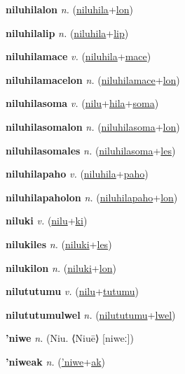 \textbf{\hypertarget{niluhilalon}{niluhilalon}} \textit{n.} (\hyperlink{niluhila}{niluhila}+\allowbreak \hyperlink{lon}{lon})


\textbf{\hypertarget{niluhilalip}{niluhilalip}} \textit{n.} (\hyperlink{niluhila}{niluhila}+\allowbreak \hyperlink{lip}{lip})


\textbf{\hypertarget{niluhilamace}{niluhilamace}} \textit{v.} (\hyperlink{niluhila}{niluhila}+\allowbreak \hyperlink{mace}{mace})


\textbf{\hypertarget{niluhilamacelon}{niluhilamacelon}} \textit{n.} (\hyperlink{niluhilamace}{niluhilamace}+\allowbreak \hyperlink{lon}{lon})


\textbf{\hypertarget{niluhilasoma}{niluhilasoma}} \textit{v.} (\hyperlink{nilu}{nilu}+\allowbreak \hyperlink{hila}{hila}+\allowbreak \hyperlink{soma}{soma})


\textbf{\hypertarget{niluhilasomalon}{niluhilasomalon}} \textit{n.} (\hyperlink{niluhilasoma}{niluhilasoma}+\allowbreak \hyperlink{lon}{lon})


\textbf{\hypertarget{niluhilasomales}{niluhilasomales}} \textit{n.} (\hyperlink{niluhilasoma}{niluhilasoma}+\allowbreak \hyperlink{les}{les})


\textbf{\hypertarget{niluhilapaho}{niluhilapaho}} \textit{v.} (\hyperlink{niluhila}{niluhila}+\allowbreak \hyperlink{paho}{paho})


\textbf{\hypertarget{niluhilapaholon}{niluhilapaholon}} \textit{n.} (\hyperlink{niluhilapaho}{niluhilapaho}+\allowbreak \hyperlink{lon}{lon})


\textbf{\hypertarget{niluki}{niluki}} \textit{v.} (\hyperlink{nilu}{nilu}+\allowbreak \hyperlink{ki}{ki})


\textbf{\hypertarget{nilukiles}{nilukiles}} \textit{n.} (\hyperlink{niluki}{niluki}+\allowbreak \hyperlink{les}{les})


\textbf{\hypertarget{nilukilon}{nilukilon}} \textit{n.} (\hyperlink{niluki}{niluki}+\allowbreak \hyperlink{lon}{lon})


\textbf{\hypertarget{nilututumu}{nilututumu}} \textit{v.} (\hyperlink{nilu}{nilu}+\allowbreak \hyperlink{tutumu}{tutumu})


\textbf{\hypertarget{nilututumulwel}{nilututumulwel}} \textit{n.} (\hyperlink{nilututumu}{nilututumu}+\allowbreak \hyperlink{lwel}{lwel})


\textbf{\hypertarget{'niwe}{'niwe}} \textit{n.} (Niu. ⟨Niuē⟩ [niweː])


\textbf{\hypertarget{'niweak}{'niweak}} \textit{n.} (\hyperlink{'niwe}{'niwe}+\allowbreak \hyperlink{ak}{ak})


